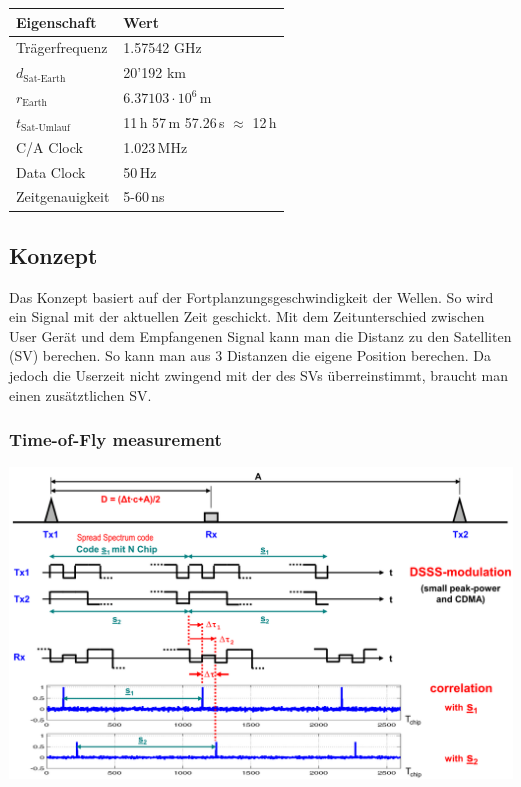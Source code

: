     \begin{minipage}{6cm}
        \begin{tabular}{|l|l|}
            \hline
                \textbf{Eigenschaft} & \textbf{Wert} \\
            \hline
	            Trägerfrequenz
	                & 1.57542 GHz \\
	            $d_{\text{Sat-Earth}}$
	                & 20'192 km \\
	            $r_{\text{Earth}}$
	               & $6.37103\cdot 10^{6}$\,m \\
	            $t_{\text{Sat-Umlauf}}$
	               & 11\,h 57\,m 57.26\,s $\approx$ 12\,h \\	         
	            C/A Clock
	               & 1.023\,MHz \\
	            Data Clock
	               & 50\,Hz \\
				Zeitgenauigkeit
				   & 5-60\,ns \\
	               
            \hline
        \end{tabular}
    \end{minipage}    

\subsection{Konzept}
	Das Konzept basiert auf der Fortplanzungsgeschwindigkeit der Wellen. So wird
	ein Signal mit der aktuellen Zeit geschickt. Mit dem Zeitunterschied
	zwischen User Gerät und dem Empfangenen Signal kann man die Distanz zu den
	Satelliten (SV) berechen. So kann man aus 3 Distanzen die eigene Position
	berechen. Da jedoch die Userzeit nicht zwingend mit der des SVs
	überreinstimmt,  braucht man einen zusätztlichen SV.

\subsubsection{Time-of-Fly measurement}
	\begin{minipage}{14cm}    
        \includegraphics[width=14cm]{./bilder/gps-timeoffly.png}    
    \end{minipage}
	
